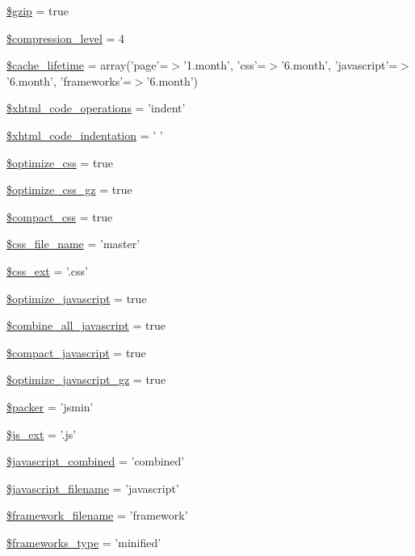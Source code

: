\begin{DoxyCompactItemize}
\hyperlink{group__general__cache__settings_ga5ac8836bca7856f49bf02d7d95c2edd2}{\$gzip} = true
\item 
\hyperlink{group__general__cache__settings_ga9a4e30766e452f0d2feaecd666787ca1}{\$compression\_\-level} = 4
\item 
\hyperlink{group__general__cache__settings_ga5aaab753f75170fa670cbb602aa97119}{\$cache\_\-lifetime} = array('page'=$>$'1.month', 'css'=$>$'6.month', 'javascript'=$>$'6.month', 'frameworks'=$>$'6.month')
\item 
\hyperlink{group__xhtml__cache__settings_ga0216b64e0f4557ed5a36e5aaeccd2745}{\$xhtml\_\-code\_\-operations} = 'indent'
\item 
\hyperlink{group__xhtml__cache__settings_ga2395c8c084b383c7fa248df50b624e9a}{\$xhtml\_\-code\_\-indentation} = ' '
\item 
\hyperlink{group__css__cache__settings_ga3d807a2e23ba55310871e3ed6c2bd356}{\$optimize\_\-css} = true
\item 
\hyperlink{group__css__cache__settings_ga78989c70ad2b35d7026f6600cfe6ba92}{\$optimize\_\-css\_\-gz} = true
\item 
\hyperlink{group__css__cache__settings_gad7ca051062e3dc2de4fa237217abef86}{\$compact\_\-css} = true
\item 
\hyperlink{group__css__cache__settings_ga2864dee7a65933d1d4c94373d542b700}{\$css\_\-file\_\-name} = 'master'
\item 
\hyperlink{group__css__cache__settings_ga80329ee2b55f386978162762e84ac3ee}{\$css\_\-ext} = '.css'
\item 
\hyperlink{group__js__cache__settings_gaf2d235fefcbea23d664080143edad37f}{\$optimize\_\-javascript} = true
\item 
\hyperlink{group__js__cache__settings_ga73a53fbf95bca0dd45d7b6cca1f6a689}{\$combine\_\-all\_\-javascript} = true
\item 
\hyperlink{group__js__cache__settings_ga8090fbc1c574d4134d6ab4b973d170d0}{\$compact\_\-javascript} = true
\item 
\hyperlink{group__js__cache__settings_ga0cdc0ded508ad7f1a3cfc63ef1df780a}{\$optimize\_\-javascript\_\-gz} = true
\item 
\hyperlink{group__js__cache__settings_ga16b8a20321620dbef3a8deb7462ef4f4}{\$packer} = 'jsmin'
\item 
\hyperlink{group__js__cache__settings_ga0d34488b74d51638331cf68641b18369}{\$js\_\-ext} = '.js'
\item 
\hyperlink{group__js__cache__settings_ga08f8005b517d19f5a2d099d7ec595e2d}{\$javascript\_\-combined} = 'combined'
\item 
\hyperlink{group__js__cache__settings_ga38703f3ad6532639e4ec66aaa9ffc03b}{\$javascript\_\-filename} = 'javascript'
\item 
\hyperlink{group__js__cache__settings_ga79efa8f1523c6f83cffbe8d18366a0f3}{\$framework\_\-filename} = 'framework'
\item 
\hyperlink{group__js__cache__settings_ga74a35165f016f24e125268a1e122c14f}{\$frameworks\_\-type} = 'minified'
\end{DoxyCompactItemize}
